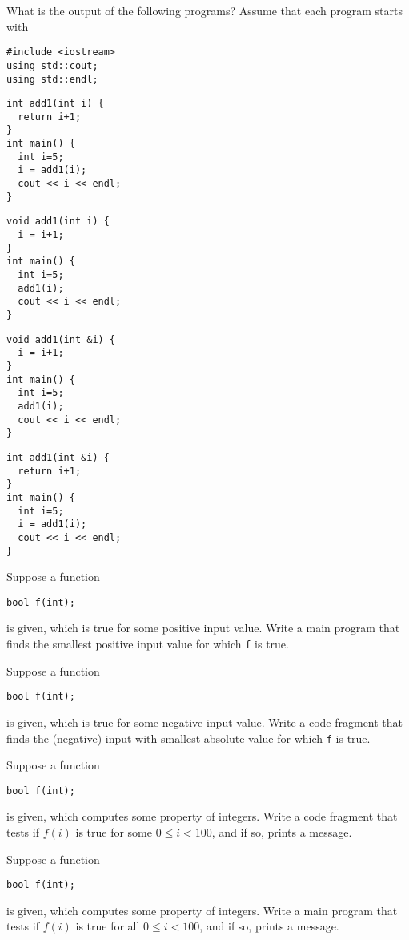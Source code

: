 \begin{review}
  What is the output of the following programs?
  Assume that each program starts with
\begin{lstlisting}
#include <iostream>
using std::cout;
using std::endl;
\end{lstlisting}

  \begin{multicols}{2}
\begin{lstlisting}
int add1(int i) {
  return i+1;
}
int main() {
  int i=5;
  i = add1(i);
  cout << i << endl;
}
\end{lstlisting}
\columnbreak
\begin{lstlisting}
void add1(int i) {
  i = i+1;
}
int main() {
  int i=5;
  add1(i);
  cout << i << endl;
}
\end{lstlisting}
  \end{multicols}

  \begin{multicols}{2}
\begin{lstlisting}
void add1(int &i) {
  i = i+1;
}
int main() {
  int i=5;
  add1(i);
  cout << i << endl;
}
\end{lstlisting}
\columnbreak
\begin{lstlisting}
int add1(int &i) {
  return i+1;
}
int main() {
  int i=5;
  i = add1(i);
  cout << i << endl;
}
\end{lstlisting}
  \end{multicols}
\end{review}

\begin{review}
  \label{ex:cpp-funcloop1}
  Suppose a function
\begin{lstlisting}
bool f(int);
\end{lstlisting}
is given, which is true for some positive input value. Write a main program that
finds the smallest positive input value for which \lstinline{f} is true.
\end{review}

\begin{review}
  \label{ex:cpp-funcloop2}
  Suppose a function
\begin{lstlisting}
bool f(int);
\end{lstlisting}
is given, which is true for some negative input value. Write a code fragment that
finds the (negative) input with smallest absolute value for which \lstinline{f} is true.
\end{review}

\begin{review}
  \label{ex:cpp-funcloop3}
  Suppose a function
\begin{lstlisting}
bool f(int);
\end{lstlisting}
is given, which computes some property of integers.
Write a code fragment that tests if $f(i)$ is true for some $0\leq
i<100$, and if so, prints a message.
\end{review}

\begin{review}
  \label{ex:cpp-funcloop4}
  Suppose a function
\begin{lstlisting}
bool f(int);
\end{lstlisting}
is given, which computes some property of integers.
Write a main program that tests if $f(i)$ is true for all $0\leq
i<100$, and if so, prints a message.
\end{review}

